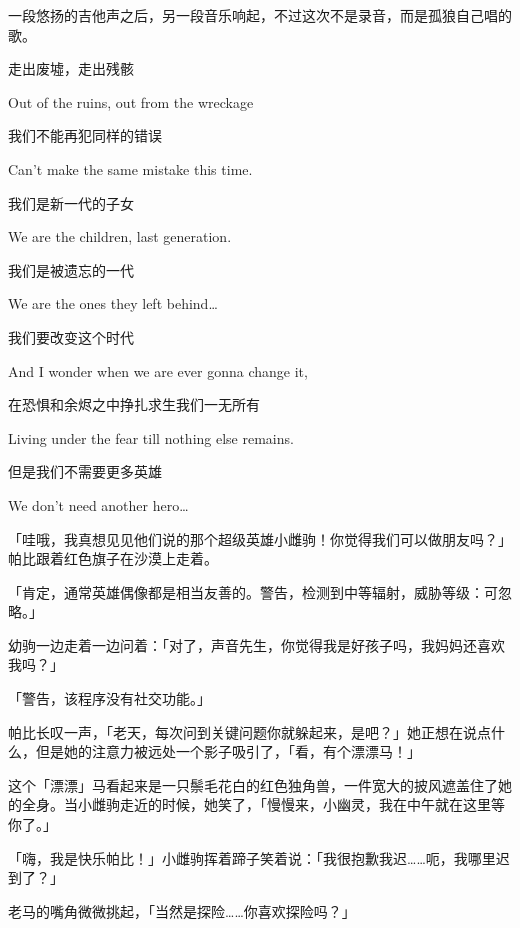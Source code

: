 一段悠扬的吉他声之后，另一段音乐响起，不过这次不是录音，而是孤狼自己唱的歌。

\begin{song}
走出废墟，走出残骸

Out of the ruins, out from the wreckage

\medskip

我们不能再犯同样的错误

Can't make the same mistake this time.

\medskip

我们是新一代的子女

We are the children, last generation.

\medskip

我们是被遗忘的一代

We are the ones they left behind\dots

\medskip

我们要改变这个时代

And I wonder when we are ever gonna change it,

\medskip

在恐惧和余烬之中挣扎求生我们一无所有

Living under the fear till nothing else remains.

\medskip

但是我们不需要更多英雄

We don't need another hero\dots
\end{song}

\horizonline

「哇哦，我真想见见他们说的那个超级英雄小雌驹！你觉得我们可以做朋友吗？」帕比跟着红色旗子在沙漠上走着。

「{\mt 肯定，通常英雄偶像都是相当友善的。警告，检测到中等辐射，威胁等级：可忽略。}」

幼驹一边走着一边问着：「对了，声音先生，你觉得我是好孩子吗，我妈妈还喜欢我吗？」

「{\mt 警告，该程序没有社交功能。}」

帕比长叹一声，「老天，每次问到关键问题你就躲起来，是吧？」她正想在说点什么，但是她的注意力被远处一个影子吸引了，「看，有个漂漂马！」

这个「漂漂」马看起来是一只鬃毛花白的红色独角兽，一件宽大的披风遮盖住了她的全身。当小雌驹走近的时候，她笑了，「慢慢来，小幽灵，我在中午就在这里等你了。」

「嗨，我是快乐帕比！」小雌驹挥着蹄子笑着说：「我很抱歉我迟……呃，我哪里迟到了？」

老马的嘴角微微挑起，「当然是探险……你喜欢探险吗？」

